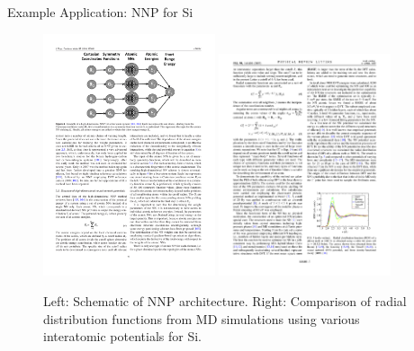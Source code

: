 \documentclass[aspectratio=169]{beamer}
\begin{document}
\begin{frame}{Example Application: NNP for Si}
    \begin{figure}
        \centering
        \includegraphics[width=0.45\textwidth]{figures/nnp.pdf}
        \includegraphics[width=0.45\textwidth]{figures/nnp-si.pdf}
        \caption{Left: Schematic of NNP architecture. Right: Comparison of radial distribution functions from MD simulations using various interatomic potentials for Si.\cite{behlerGeneralizedNeuralNetworkRepresentation2007}}
        \label{fig:my_label}
    \end{figure}
\end{frame}
\end{document}
